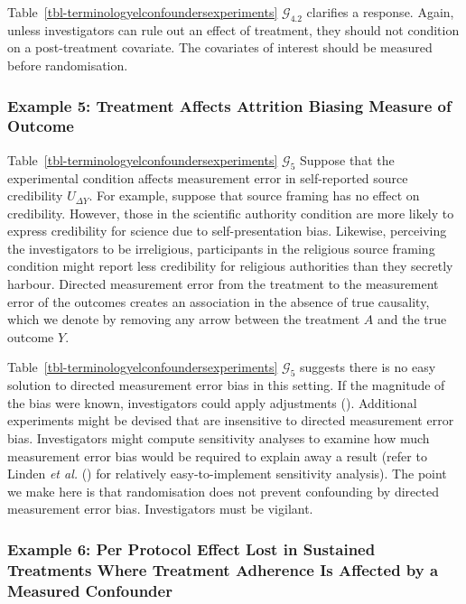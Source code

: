 \documentclass[
  single column]{article}
\begin{document}
Table~\ref{tbl-terminologyelconfoundersexperiments}
\(\mathcal{G}_{4.2}\) clarifies a response. Again, unless investigators
can rule out an effect of treatment, they should not condition on a
post-treatment covariate. The covariates of interest should be measured
before randomisation.

\subsubsection{Example 5: Treatment Affects Attrition Biasing Measure of
Outcome}\label{example-5-treatment-affects-attrition-biasing-measure-of-outcome}

Table~\ref{tbl-terminologyelconfoundersexperiments} \(\mathcal{G}_{5}\)
Suppose that the experimental condition affects measurement error in
self-reported source credibility \(U_{\Delta Y}\). For example, suppose
that source framing has no effect on credibility. However, those in the
scientific authority condition are more likely to express credibility
for science due to self-presentation bias. Likewise, perceiving the
investigators to be irreligious, participants in the religious source
framing condition might report less credibility for religious
authorities than they secretly harbour. Directed measurement error from
the treatment to the measurement error of the outcomes creates an
association in the absence of true causality, which we denote by
removing any arrow between the treatment \(A\) and the true outcome
\(Y\).

Table~\ref{tbl-terminologyelconfoundersexperiments} \(\mathcal{G}_{5}\)
suggests there is no easy solution to directed measurement error bias in
this setting. If the magnitude of the bias were known, investigators
could apply adjustments (). Additional experiments might be devised that are
insensitive to directed measurement error bias. Investigators might
compute sensitivity analyses to examine how much measurement error bias
would be required to explain away a result (refer to Linden \emph{et
al.} () for relatively
easy-to-implement sensitivity analysis). The point we make here is that
randomisation does not prevent confounding by directed measurement error
bias. Investigators must be vigilant.

\subsubsection{Example 6: Per Protocol Effect Lost in Sustained
Treatments Where Treatment Adherence Is Affected by a Measured
Confounder}\label{example-6-per-protocol-effect-lost-in-sustained-treatments-where-treatment-adherence-is-affected-by-a-measured-confounder}
\end{document}
